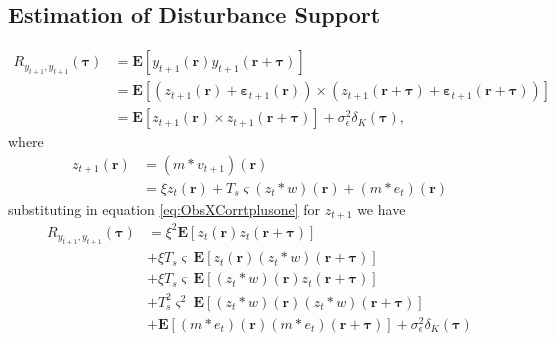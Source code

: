 \documentclass[]{article}
\begin{document}
\subsection*{Estimation of Disturbance Support}
\begin{align}
	R_{y_{t+1},y_{t+1}}(\boldsymbol{\tau}) &= \mathbf{E}\left[ y_{t+1}\left(\mathbf{r}\right) y_{t+1}\left(\mathbf{r}+\boldsymbol{\tau}\right) \right] \nonumber \\
	&= \mathbf{E}\left[\left(z_{t+1}\left(\mathbf r\right)  + \boldsymbol{\varepsilon}_{t+1}\left(\mathbf{r}\right) \right) \times \left(z_{t+1}\left(\mathbf{r}+\boldsymbol{\tau}\right)+ \boldsymbol{\varepsilon}_{t+1}\left(\mathbf{r}+\boldsymbol{\tau}\right)\right) \right] \nonumber \\
 &= \mathbf{E}\left[z_{t+1}\left(\mathbf r\right)  \times z_{t+1}\left(\mathbf{r}+\boldsymbol{\tau}\right) \right]+\sigma_{\epsilon}^2\delta_{K}\left(\boldsymbol\tau\right),\label{eq:ObsXCorrtplusone}
\end{align}
where
\begin{align}
z_{t+1}\left(\mathbf r\right)&=\left(m\ast v_{t+1}\right)\left(\mathbf{r}\right) \nonumber \\
&=\xi z_{t}\left(\mathbf r\right)+T_s\varsigma\left(z_t \ast w\right)\left(\mathbf r\right)+\left(m\ast e_t\right)\left(\mathbf r\right)\label{eq:zvariable}
\end{align}
substituting in equation \ref{eq:ObsXCorrtplusone} for $z_{t+1}$ we have
\begin{align}
	R_{y_{t+1},y_{t+1}}(\boldsymbol{\tau}) &=  \xi^2\mathbf{E}\left[ z_t\left(\mathbf r\right)z_t\left(\mathbf r+\boldsymbol \tau\right)\right] \nonumber \\
						&+\xi T_s\varsigma \ \mathbf{E}\left[z_t\left(\mathbf r\right)\left(z_t \ast w\right)\left(\mathbf r+\boldsymbol\tau\right)\right]\nonumber \\
						&+\xi T_s\varsigma \ \mathbf{E}\left[\left(z_t \ast w\right)\left(\mathbf r\right)z_t\left(\mathbf r+\boldsymbol\tau\right)\right]\nonumber \\
						&+T_s^2\varsigma^2 \ \mathbf{E}\left[\left(z_t \ast w\right)\left(\mathbf r\right)\left(z_t \ast w\right)\left(\mathbf r+\boldsymbol\tau\right)\right]\nonumber \\
						&+\mathbf{E}\left[\left(m \ast e_t\right)\left(\mathbf r\right)\left(m \ast e_t\right)\left(\mathbf r+\boldsymbol\tau\right)\right]+\sigma_{\epsilon}^2\delta_{K}\left(\boldsymbol\tau\right)\label{eq:AutocorrExpansion}
\end{align}
\end{document}
